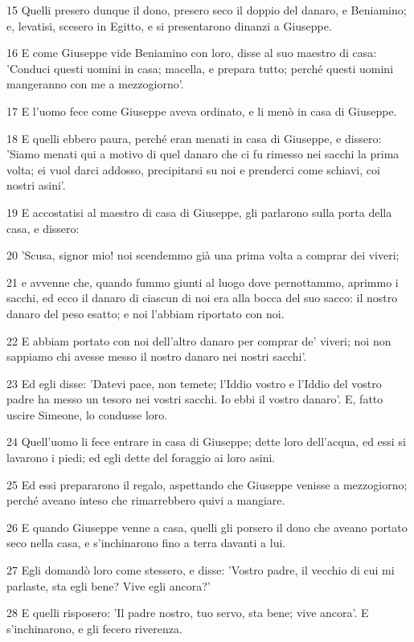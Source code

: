 \par 15 Quelli presero dunque il dono, presero seco il doppio del danaro, e Beniamino; e, levatisi, scesero in Egitto, e si presentarono dinanzi a Giuseppe.
\par 16 E come Giuseppe vide Beniamino con loro, disse al suo maestro di casa: 'Conduci questi uomini in casa; macella, e prepara tutto; perché questi uomini mangeranno con me a mezzogiorno'.
\par 17 E l'uomo fece come Giuseppe aveva ordinato, e li menò in casa di Giuseppe.
\par 18 E quelli ebbero paura, perché eran menati in casa di Giuseppe, e dissero: 'Siamo menati qui a motivo di quel danaro che ci fu rimesso nei sacchi la prima volta; ei vuol darci addosso, precipitarsi su noi e prenderci come schiavi, coi nostri asini'.
\par 19 E accostatisi al maestro di casa di Giuseppe, gli parlarono sulla porta della casa, e dissero:
\par 20 'Scusa, signor mio! noi scendemmo già una prima volta a comprar dei viveri;
\par 21 e avvenne che, quando fummo giunti al luogo dove pernottammo, aprimmo i sacchi, ed ecco il danaro di ciascun di noi era alla bocca del suo sacco: il nostro danaro del peso esatto; e noi l'abbiam riportato con noi.
\par 22 E abbiam portato con noi dell'altro danaro per comprar de' viveri; noi non sappiamo chi avesse messo il nostro danaro nei nostri sacchi'.
\par 23 Ed egli disse: 'Datevi pace, non temete; l'Iddio vostro e l'Iddio del vostro padre ha messo un tesoro nei vostri sacchi. Io ebbi il vostro danaro'. E, fatto uscire Simeone, lo condusse loro.
\par 24 Quell'uomo li fece entrare in casa di Giuseppe; dette loro dell'acqua, ed essi si lavarono i piedi; ed egli dette del foraggio ai loro asini.
\par 25 Ed essi prepararono il regalo, aspettando che Giuseppe venisse a mezzogiorno; perché aveano inteso che rimarrebbero quivi a mangiare.
\par 26 E quando Giuseppe venne a casa, quelli gli porsero il dono che aveano portato seco nella casa, e s'inchinarono fino a terra davanti a lui.
\par 27 Egli domandò loro come stessero, e disse: 'Vostro padre, il vecchio di cui mi parlaste, sta egli bene? Vive egli ancora?'
\par 28 E quelli risposero: 'Il padre nostro, tuo servo, sta bene; vive ancora'. E s'inchinarono, e gli fecero riverenza.
